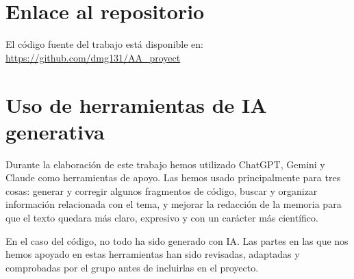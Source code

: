 \documentclass[11pt,a4paper]{article}
\begin{document}
\section{Enlace al repositorio}

El código fuente del trabajo está disponible en:
\url{https://github.com/dmg131/AA_proyect}

\section{Uso de herramientas de IA generativa}

Durante la elaboración de este trabajo hemos utilizado ChatGPT, Gemini y Claude como herramientas de apoyo. Las hemos usado principalmente para tres cosas: generar y corregir algunos fragmentos de código, buscar y organizar información relacionada con el tema, y mejorar la redacción de la memoria para que el texto quedara más claro, expresivo y con un carácter más científico.

En el caso del código, no todo ha sido generado con IA. Las partes en las que nos hemos apoyado en estas herramientas han sido revisadas, adaptadas y comprobadas por el grupo antes de incluirlas en el proyecto.
\end{document}
